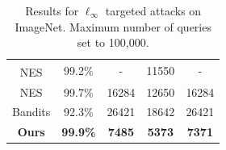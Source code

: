 \documentclass[10pt,mathserif]{beamer}
\begin{document}
\begin{frame}
\begin{columns}
\begin{column}{0.50\columnwidth}
\begin{table}[htbp]
\begin{adjustbox}{max width=\columnwidth}
\begin{tabular}{cccc|c}
			NES\textsuperscript{\textdagger}& 99.2\% & - & 11550 & - \\
			NES & 99.7\% & 16284 & 12650 & 16284 \\
			Bandits & 92.3\%  & 26421 & 18642 & 26421 \\
			\textbf{Ours} & \textbf{99.9\%} & \textbf{7485} & \textbf{5373}& \textbf{7371} \\
			\bottomrule[1pt]
		\end{tabular}
	\end{adjustbox}
    \caption{Results for $\ell_\infty$ targeted attacks on ImageNet. Maximum number of queries set to 100,000.}
    \end{table}
    \end{column}
    \end{columns}
\end{frame}
\end{document}
